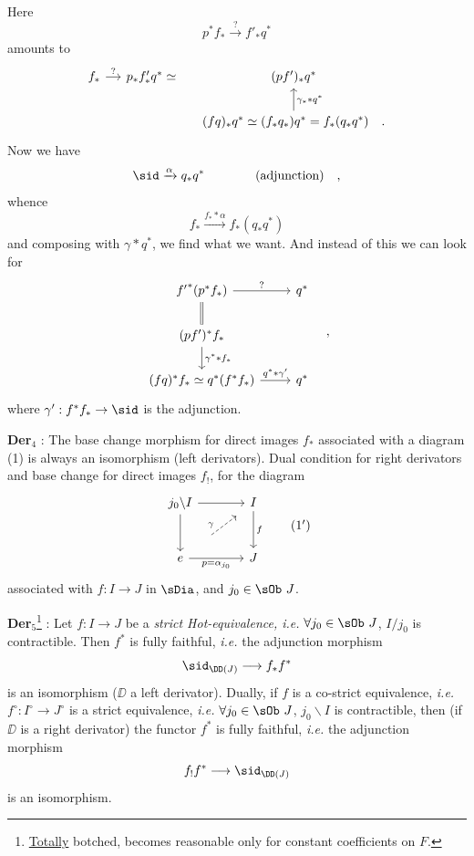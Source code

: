 Here
\[ p^* f_* \xrightarrow{?} f'_* q^* \]
amounts to
\[
\begin{tikzcd}[column sep=small]
f_* \arrow[r, "?"] & p_* f'_* q^* \simeq & (pf')_* q^* \\
 & & (fq)_* q^* \simeq (f_* q_*) q^* = f_*(q_* q^*) \quad . \arrow[u, "\gamma_* * q^*"']
\end{tikzcd}
\]
Now we have
\[ \sid \xrightarrow{\alpha} q_* q^* \qquad\qquad \text{(adjunction)} \quad , \]
whence
\[ f_* \xrightarrow{f_* * \alpha} f_*(q_* q^*) \]
and composing with $\gamma * q^*$, we find what we want. And instead of this we can look for
\[
\begin{tikzcd}
{f'}^*(p^* f_*) \arrow[r, "?"] \arrow[d, equal] & q^* \\
(pf')^* f_* \arrow[d, "\gamma^* * f_*"] & \\
(fq)^* f_* \simeq q^*(f^* f_*) \arrow[r, "q^* * \gamma'"] & q^*
\end{tikzcd}
\quad ,
\]
where $\gamma' : f^* f_* \to \sid$ is the adjunction.

\textbf{Der}$_4$ : The base change morphism for direct images $f_*$ associated with a diagram (1) is always an isomorphism (left derivators). Dual condition for right derivators and base change for direct images $f_!$, for the diagram
\[
\begin{tikzcd}[row sep=large, column sep=large]
j_0 \backslash I \arrow[r] \arrow[d] & I \arrow[d, "f"] \\
e \arrow[r, "p = \alpha_{j_0}"'] & J
\arrow[from=2-1, to=1-2, dashed, shorten <=22pt, shorten >=8pt, "\gamma"]
\end{tikzcd}
\tag*{(1$'$)}
\]
associated with $f : I \to J$ in $\sDia$, and $j_0 \in \sOb\ J$.

\textbf{Der}$_5$\footnote[10]{\underline{Totally} botched, becomes reasonable only for constant coefficients on $F$.} : Let $f : I \to J$ be a \textit{strict Hot-equivalence, i.e.} $\forall j_0 \in \sOb\ J$, $I/j_0$ is contractible. Then $f^*$ is fully faithful, \textit{i.e.} the adjunction morphism
\[ \sid_{\DD(J)} \longrightarrow f_* f^* \]
is an isomorphism ($\DD$ a left derivator). Dually, if $f$ is a co-strict equivalence, \textit{i.e.} $f^\circ : I^\circ \to J^\circ$ is a strict equivalence, \textit{i.e.} $\forall j_0 \in \sOb\ J$, $j_0 \backslash I$ is contractible, then (if $\DD$ is a right derivator) the functor $f^*$ is fully faithful, \textit{i.e.} the adjunction morphism %
\[ f_! f^* \longrightarrow \sid_{\DD(J)} \]
is an isomorphism.

